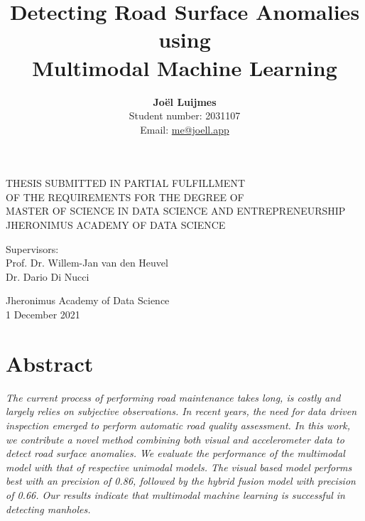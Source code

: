 \documentclass{article}
\begin{document}

\title{
    \textbf{Detecting Road Surface Anomalies using\\
    Multimodal Machine Learning}
}
\author{
\textbf{Joël Luijmes} \\ 
\small{Student number: 2031107} \\
\small{Email: \href{mailto:me@joell.app}{me@joell.app}}
}

\date{}
\maketitle
\thispagestyle{empty}

\vskip 3cm

{\centering

THESIS SUBMITTED IN PARTIAL FULFILLMENT \\
OF THE REQUIREMENTS FOR THE DEGREE OF \\
MASTER OF SCIENCE IN DATA SCIENCE AND ENTREPRENEURSHIP \\
JHERONIMUS ACADEMY OF DATA SCIENCE

\vskip 6cm

Supervisors: \\
Prof. Dr. Willem-Jan van den Heuvel \\
Dr. Dario Di Nucci

\vskip 3cm

Jheronimus Academy of Data Science \\
1 December 2021

\par}

\newpage
\thispagestyle{empty}
\mbox{}
\newpage
\thispagestyle{empty}

\section*{Abstract}

\begin{adjustwidth}{1cm}{2cm}
\textit{The current process of performing road maintenance takes long, is costly and largely relies on subjective observations. In recent years, the need for data driven inspection emerged to perform automatic road quality assessment. In this work, we contribute a novel method combining both visual and accelerometer data to detect road surface anomalies. We evaluate the performance of the multimodal model with that of respective unimodal models. The visual based model performs best with an precision of 0.86, followed by the hybrid fusion model with precision of 0.66. Our results indicate that multimodal machine learning is successful in detecting manholes.
}
\end{adjustwidth}


\newpage
\thispagestyle{empty}
\mbox{}
\newpage
\thispagestyle{empty}

\tableofcontents










\end{document}
